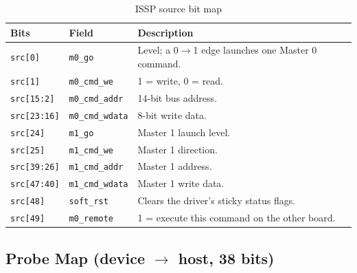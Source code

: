 \documentclass[11pt,a4paper]{article}
\newcommand{\sig}[1]{\texttt{#1}}
\begin{document}
\begin{table}[htbp]
\centering
\caption{ISSP source bit map}
\label{tab:issp_src}
\small
\begin{tabularx}{\textwidth}{llX}
\toprule
\textbf{Bits} & \textbf{Field} & \textbf{Description} \\
\midrule
\sig{src[0]}     & \sig{m0\_go}         & Level; a 0$\rightarrow$1 edge launches one Master 0 command. \\
\sig{src[1]}     & \sig{m0\_cmd\_we}    & 1 = write, 0 = read. \\
\sig{src[15:2]}  & \sig{m0\_cmd\_addr}  & 14-bit bus address. \\
\sig{src[23:16]} & \sig{m0\_cmd\_wdata} & 8-bit write data. \\
\sig{src[24]}    & \sig{m1\_go}         & Master 1 launch level. \\
\sig{src[25]}    & \sig{m1\_cmd\_we}    & Master 1 direction. \\
\sig{src[39:26]} & \sig{m1\_cmd\_addr}  & Master 1 address. \\
\sig{src[47:40]} & \sig{m1\_cmd\_wdata} & Master 1 write data. \\
\sig{src[48]}    & \sig{soft\_rst}      & Clears the driver's sticky status flags. \\
\sig{src[49]}    & \sig{m0\_remote}     & 1 = execute this command on the other board. \\
\bottomrule
\end{tabularx}
\end{table}

\subsection{Probe Map (device $\rightarrow$ host, 38 bits)}
\end{document}
